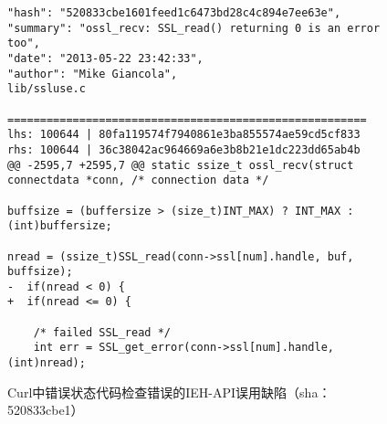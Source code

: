 \begin{figure}[b]
	\centering
\begin{lstlisting}
"hash": "520833cbe1601feed1c6473bd28c4c894e7ee63e",
"summary": "ossl_recv: SSL_read() returning 0 is an error too",
"date": "2013-05-22 23:42:33",
"author": "Mike Giancola",
lib/ssluse.c

=======================================================
lhs: 100644 | 80fa119574f7940861e3ba855574ae59cd5cf833
rhs: 100644 | 36c38042ac964669a6e3b8b21e1dc223dd65ab4b
@@ -2595,7 +2595,7 @@ static ssize_t ossl_recv(struct connectdata *conn, /* connection data */

buffsize = (buffersize > (size_t)INT_MAX) ? INT_MAX : (int)buffersize;

nread = (ssize_t)SSL_read(conn->ssl[num].handle, buf, buffsize);
-  if(nread < 0) {
+  if(nread <= 0) {

	/* failed SSL_read */
	int err = SSL_get_error(conn->ssl[num].handle, (int)nread);

\end{lstlisting}
	\caption{
	Curl中错误状态代码检查错误的IEH-API误用缺陷（sha：520833cbe1）
	}
	\label{fig:2-3-ieh-2}
\end{figure}
